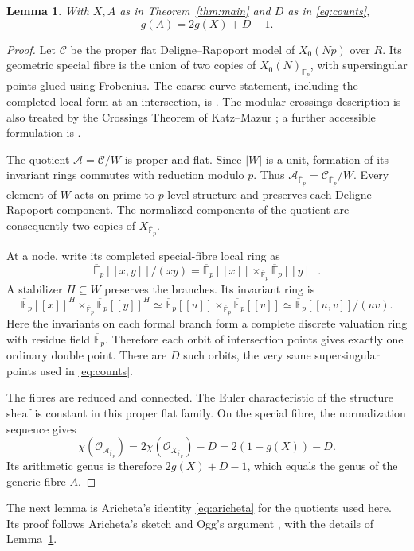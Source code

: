 \documentclass[11pt,a4paper]{article}
\newtheorem{lemma}[theorem]{Lemma}
\theoremstyle{remark}\newtheorem{remark}[theorem]{Remark}
\numberwithin{equation}{section}
\newcommand{\kk}{\overline{\mathbb F}_p}
\begin{document}
	\begin{lemma}\label{lem:total}
		With $X,A$ as in Theorem~\ref{thm:main} and $D$ as in \eqref{eq:counts},
		\begin{equation}\label{eq:total}
			g(A)=2g(X)+D-1.
		\end{equation}
	\end{lemma}
	\begin{proof}
		Let $\mathscr C$ be the proper flat Deligne--Rapoport model of $X_0(Np)$ over $R$. Its geometric special fibre is the union of two copies of $X_0(N)_{\kk}$, with supersingular points glued using Frobenius. The coarse-curve statement, including the completed local form at an intersection, is \cite[VI, Theorem 6.9(ii)--(iii), Corollary 6.10]{DR}. The modular crossings description is also treated by the Crossings Theorem of Katz--Mazur \cite[Theorem 13.1.3, p.~390]{KM}; a further accessible formulation is \cite[Theorem 2.7]{Niles}.
		
		The quotient $\mathscr A=\mathscr C/W$ is proper and flat. Since $|W|$ is a unit, formation of its invariant rings commutes with reduction modulo $p$. Thus $\mathscr A_{\kk}=\mathscr C_{\kk}/W$. Every element of $W$ acts on prime-to-$p$ level structure and preserves each Deligne--Rapoport component. The normalized components of the quotient are consequently two copies of $X_{\kk}$.
		
		At a node, write its completed special-fibre local ring as
		\[
		\kk[[x,y]]/(xy)
		=\kk[[x]]\mathbin{\times}_{\kk}\kk[[y]].
		\]
		A stabilizer $H\subseteq W$ preserves the branches. Its invariant ring is
		\[
		\kk[[x]]^H\mathbin{\times}_{\kk}\kk[[y]]^H
		\simeq\kk[[u]]\mathbin{\times}_{\kk}\kk[[v]]
		\simeq\kk[[u,v]]/(uv).
		\]
		Here the invariants on each formal branch form a complete discrete valuation ring with residue field $\kk$. Therefore each orbit of intersection points gives exactly one ordinary double point. There are $D$ such orbits, the very same supersingular points used in \eqref{eq:counts}.
		
		The fibres are reduced and connected. The Euler characteristic of the structure sheaf is constant in this proper flat family. On the special fibre, the normalization sequence gives
		\[
		\chi(\mathcal O_{\mathscr A_{\kk}})
		=2\chi(\mathcal O_{X_{\kk}})-D=2(1-g(X))-D.
		\]
		Its arithmetic genus is therefore $2g(X)+D-1$, which equals the genus of the generic fibre $A$.
	\end{proof}
	
	The next lemma is Aricheta's identity \eqref{eq:aricheta} for the quotients used here. Its proof follows Aricheta's sketch and Ogg's argument \cite{OggRed}, with the details of Lemma~\ref{lem:total}.
	
\end{document}
